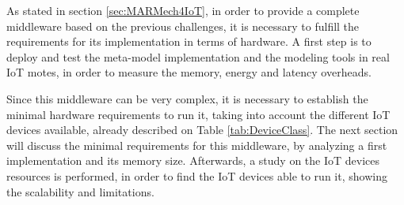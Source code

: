 As stated in section \ref{sec:MARMech4IoT}, in order to provide a complete middleware based on the previous challenges, it is necessary to fulfill the requirements for its implementation in terms of hardware.
A first step is to deploy and test the meta-model implementation and the modeling tools in real IoT motes, in order to measure the memory, energy and latency overheads.

Since this middleware can be very complex, it is necessary to establish the minimal hardware requirements to run it, taking into account the different IoT devices available, already described on Table \ref{tab:DeviceClass}.
The next section will discuss the minimal requirements for this middleware, by analyzing a first implementation and its memory size.
Afterwards, a study on the IoT devices resources is performed, in order to find the IoT devices able to run it, showing the scalability and limitations.



